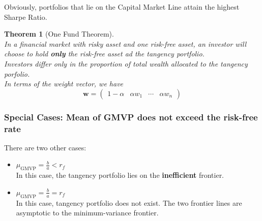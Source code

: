 \documentclass[12pt]{article}
\newtheorem{theorem}{Theorem}[section]
\theoremstyle{definition}
\begin{document}
Obviously, portfolios that lie on the Capital Market Line attain the highest Sharpe Ratio.
\begin{theorem}[One Fund Theorem]
\hfill\\\normalfont In a financial market with risky asset and \textit{one risk-free} asset, an investor will choose to hold \textbf{only} the risk-free asset ad the tangency portfolio.\\Investors differ only in the proportion of total wealth allocated to the tangency porfolio.\\In terms of the weight vector, we have
\[
\mathbf{w}=\begin{pmatrix}1-\alpha&\alpha w_1&\cdots&\alpha w_n\end{pmatrix}
\]
\end{theorem}
\subsubsection{Special Cases: Mean of GMVP does not exceed the risk-free rate}
There are two other cases:
\begin{itemize}
  \item $\mu_\text{GMVP}=\frac{b}{a}<r_f$\\In this case, the tangency portfolio lies on the \textbf{inefficient} frontier.
  \item $\mu_\text{GMVP}=\frac{b}{a}=r_f$\\In this case, tangency portfolio does not exist. The two frontier lines are asymptotic to the minimum-variance frontier.
\end{itemize}
\end{document}
